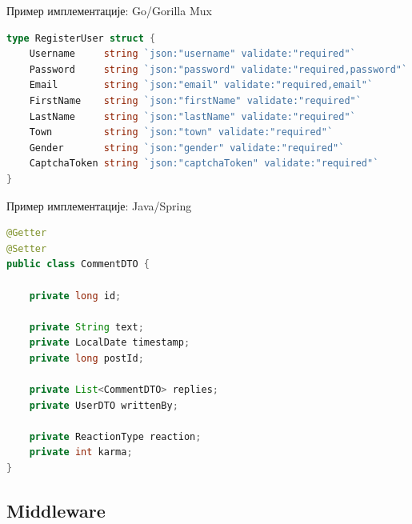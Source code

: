 \documentclass[aspectratio=169]{beamer}
\begin{document}
    \begin{frame}[fragile]{Пример имплементације: Go/Gorilla Mux}
        \begin{adjustbox}{width=\textwidth,height=\textheight,keepaspectratio}
            \begin{lstlisting}[language=go]
type RegisterUser struct {
    Username     string `json:"username" validate:"required"`
    Password     string `json:"password" validate:"required,password"`
    Email        string `json:"email" validate:"required,email"`
    FirstName    string `json:"firstName" validate:"required"`
    LastName     string `json:"lastName" validate:"required"`
    Town         string `json:"town" validate:"required"`
    Gender       string `json:"gender" validate:"required"`
    CaptchaToken string `json:"captchaToken" validate:"required"`
}
            \end{lstlisting}
        \end{adjustbox}
    \end{frame}
    
    \begin{frame}[fragile]{Пример имплементације: Java/Spring}
        \begin{adjustbox}{width=\textwidth,height=0.4\textheight,keepaspectratio}
            \begin{lstlisting}[language=java]
@Getter
@Setter
public class CommentDTO {

    private long id;

    private String text;
    private LocalDate timestamp;
    private long postId;

    private List<CommentDTO> replies;
    private UserDTO writtenBy;

    private ReactionType reaction;
    private int karma;
}
            \end{lstlisting}
        \end{adjustbox}
    \end{frame}
    
    \subsection[]{Middleware}
    
\end{document}
